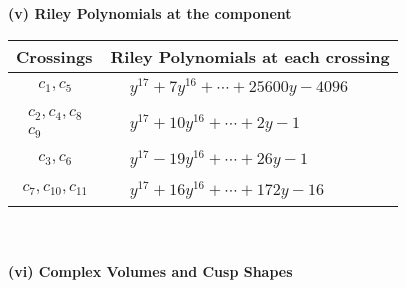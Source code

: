 \documentclass[1p]{elsarticle_modified}
\theoremstyle{definition}
\begin{document}
\newpage\renewcommand{\arraystretch}{1}
\flushleft \textbf{(v) Riley Polynomials at the component}\newline \\
\begin{tabular}{m{50pt}|m{274pt}}
Crossings & \hspace{64pt}Riley Polynomials at each crossing \\
\hline $$\begin{aligned}c_{1},c_{5}\end{aligned}$$&$\begin{aligned}
&y^{17}+7 y^{16}+\cdots+25600 y-4096
\end{aligned}$\\
\hline $$\begin{aligned}c_{2},c_{4},c_{8}\\c_{9}\end{aligned}$$&$\begin{aligned}
&y^{17}+10 y^{16}+\cdots+2 y-1
\end{aligned}$\\
\hline $$\begin{aligned}c_{3},c_{6}\end{aligned}$$&$\begin{aligned}
&y^{17}-19 y^{16}+\cdots+26 y-1
\end{aligned}$\\
\hline $$\begin{aligned}c_{7},c_{10},c_{11}\end{aligned}$$&$\begin{aligned}
&y^{17}+16 y^{16}+\cdots+172 y-16
\end{aligned}$\\
\hline
\end{tabular}\\~\\
\newpage\flushleft \textbf{(vi) Complex Volumes and Cusp Shapes}
\end{document}
